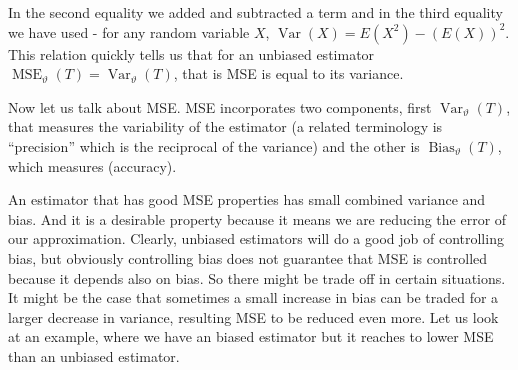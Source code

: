 \documentclass[ 11pt,%
				a4paper,%
				twoside,%
				headinclude,%
				footinclude = true,%
				cleardoublepage = empty,%
				reqno]{scrbook}
\begin{document}
In the second equality we added and subtracted a term and in the third equality we have used - for any random variable $X$, $\operatorname{Var}(X) = E(X^2) - \left(E(X)\right)^2$. This relation quickly tells us that for an unbiased estimator $\operatorname{MSE}_{\vartheta}(T) = \operatorname{Var}_{\vartheta}(T)$, that is  MSE is equal to its variance. 

Now let us talk about MSE. MSE incorporates two components, first $\operatorname{Var}_{\vartheta}(T)$, that measures the variability of the estimator (a related terminology is ``precision'' which is the reciprocal of the variance) and the other is $\operatorname{Bias}_{\vartheta}(T)$, which measures (accuracy). 

An estimator that has good MSE properties has small combined variance and bias. And it is a desirable property because it means we are reducing the error of our approximation. Clearly, unbiased estimators will do a good job of controlling bias, but obviously controlling bias does not guarantee that MSE is controlled because it depends also on bias. So there might be trade off in certain situations. It might be the case that sometimes a small increase in bias can be traded for a larger decrease in variance, resulting MSE to be reduced even more. Let us look at an example, where we have an biased estimator but it reaches to lower MSE than an unbiased estimator.
\end{document}
